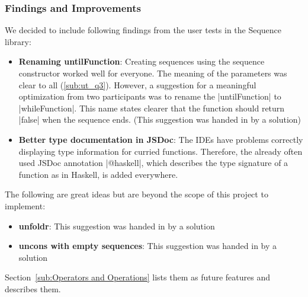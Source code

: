 \subsubsection{Findings and Improvements} %
\label{subsub:seq_findings_and_improvements}
We decided to include following findings from the user tests in the Sequence
library:
\begin{itemize}
  \item \textbf{Renaming untilFunction}: Creating sequences using the sequence
    constructor worked well for everyone. The meaning of the parameters was
    clear to all (\ref{sub:ut_q3}). However, a suggestion for a meaningful
    optimization from two participants was to rename the |untilFunction| to
    |whileFunction|. This name states clearer that the function should return
    |false| when the sequence ends. (This suggestion was handed in by a
    solution)
  \item \textbf{Better type documentation in JSDoc}: The IDEs have problems
    correctly displaying type information for curried functions.
    Therefore, the already often used JSDoc annotation |@haskell|, which
    describes the type signature of a function as in Haskell, is added
    everywhere.
\end{itemize}
The following are great ideas but are beyond the scope of this project to
implement:
\begin{itemize}
  \item \textbf{unfoldr}: This suggestion was handed in by a solution
  \item \textbf{uncons with empty sequences}: This suggestion was handed in by a solution
\end{itemize}
Section~\ref{sub:Operators and Operations} lists them as future features and
describes them.

